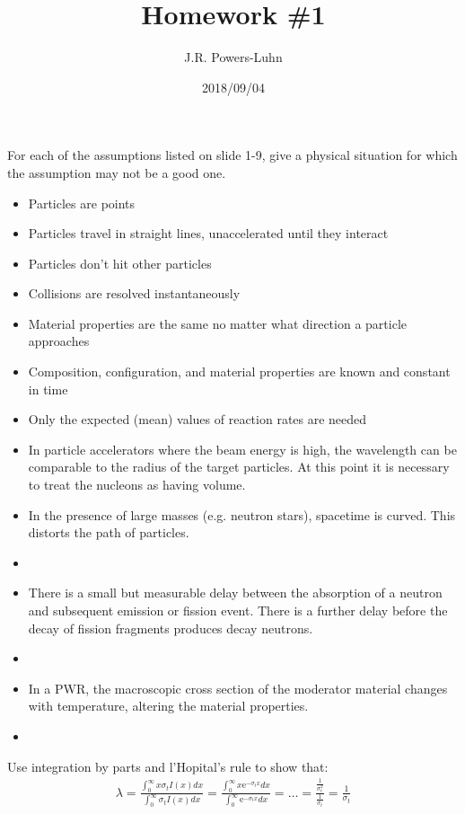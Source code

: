 \documentclass{hw}
\author{J.R. Powers-Luhn}
\date{2018/09/04}
\title{Homework \#1}
\begin{document}
\problem{}
    For each of the assumptions listed on slide 1-9, give a physical situation for which the assumption may not be a good one.
    \begin{itemize}
        \item Particles are points
        \item Particles travel in straight lines, unaccelerated until they interact
        \item Particles don't hit other particles
        \item Collisions are resolved instantaneously
        \item Material properties are the same no matter what direction a particle approaches
        \item Composition, configuration, and material properties are known and constant in time
        \item Only the expected (mean) values of reaction rates are needed
    \end{itemize}

\solution
    \begin{itemize}
        \item In particle accelerators where the beam energy is high, the wavelength can be comparable to the radius of the target particles. At this point it is necessary to treat the nucleons as having volume.
        \item In the presence of large masses (e.g. neutron stars), spacetime is curved. This distorts the path of particles.
        \item 
        \item There is a small but measurable delay between the absorption of a neutron and subsequent emission or fission event. There is a further delay before the decay of fission fragments produces decay neutrons.
        \item 
        \item In a PWR, the macroscopic cross section of the moderator material changes with temperature, altering the material properties.
        \item 
    \end{itemize}

\problem{}
    Use integration by parts and l'Hopital's rule to show that:
    \begin{align*}
        \lambda = \frac{\int_0^\infty x \sigma_t I(x) dx}{\int_0^\infty \sigma_t I(x) dx} = \frac{\int_0^\infty x \mathrm{e}^{-\sigma_t x} dx }{\int_0^\infty \mathrm{e}^{-\sigma_t x} dx} = \ldots = \frac{\frac{1}{\sigma_t^2}}{\frac{1}{\sigma_t}} = \frac{1}{\sigma_t} 
    \end{align*}
\end{document}
